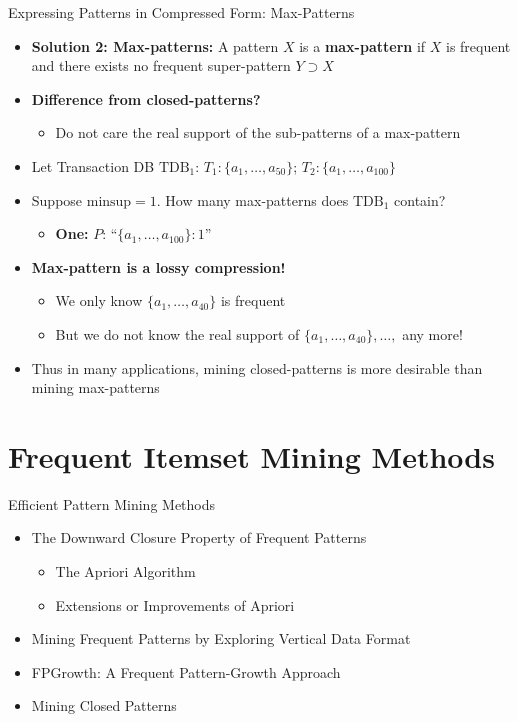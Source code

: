 \documentclass[aspectratio=169, 11pt]{beamer}
\begin{document}
\begin{frame}{Expressing Patterns in Compressed Form: Max-Patterns}
    \begin{itemize}
        \item \textbf{Solution 2: Max-patterns:} A pattern $X$ is a \textbf{max-pattern} if $X$ is frequent and there exists no frequent super-pattern $Y \supset X$
        \item \textbf{Difference from closed-patterns?}
        \begin{itemize}
            \item Do not care the real support of the sub-patterns of a max-pattern
        \end{itemize}
        \item Let Transaction DB $\text{TDB}_1$: $T_1: \{a_1, \dots, a_{50}\}$; \quad $T_2: \{a_1, \dots, a_{100}\}$
        \item Suppose $\text{minsup} = 1$. How many max-patterns does $\text{TDB}_1$ contain?
        \begin{itemize}
            \item \textbf{One:} $P$: ``$\{a_1, \dots, a_{100}\}: 1$''
        \end{itemize}
        \item \textbf{Max-pattern is a lossy compression!}
        \begin{itemize}
            \item We only know $\{a_1, \dots, a_{40}\}$ is frequent
            \item But we do not know the real support of $\{a_1, \dots, a_{40}\}, \dots,$ any more!
        \end{itemize}
        \item Thus in many applications, mining closed-patterns is more desirable than mining max-patterns
    \end{itemize}
\end{frame}

\section{Frequent Itemset Mining Methods}

\begin{frame}{Efficient Pattern Mining Methods}
    \begin{itemize}
        \item The Downward Closure Property of Frequent Patterns
        \begin{itemize}
            \item The Apriori Algorithm
            \item Extensions or Improvements of Apriori
        \end{itemize}
        \item Mining Frequent Patterns by Exploring Vertical Data Format
        \item FPGrowth: A Frequent Pattern-Growth Approach
        \item Mining Closed Patterns
    \end{itemize}
\end{frame}
\end{document}

